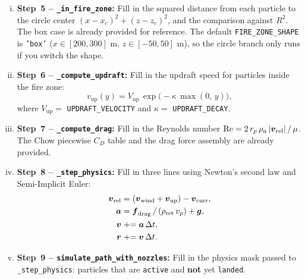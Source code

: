 \documentclass{article}
\begin{document}
\begin{enumerate}
\begin{enumerate}[(i)]
    \item \textbf{Step~5 -- \texttt{\_in\_fire\_zone}:}
          Fill in the squared distance from each particle to the circle center
          $(x - x_c)^2 + (z - z_c)^2$, and the comparison against $R^2$.
          The box case is already provided for reference. The default \texttt{FIRE\_ZONE\_SHAPE} is \texttt{'box'} ($x \in [200, 300]$ m, $z \in [-50, 50]$ m), so the circle branch only runs if you switch the shape.

    \item \textbf{Step~6 -- \texttt{\_compute\_updraft}:}
          Fill in the updraft speed for particles inside the fire zone:
          \begin{equation*}
              v_\text{up}(y) = V_\text{up}\,\exp\!\bigl(-\kappa\,\max(0,\,y)\bigr),
          \end{equation*}
          where $V_\text{up} = $ \texttt{UPDRAFT\_VELOCITY} and $\kappa = $ \texttt{UPDRAFT\_DECAY}.

    \item \textbf{Step~7 -- \texttt{\_compute\_drag}:}
          Fill in the Reynolds number
          $\mathrm{Re} = 2\,r_p\,\rho_a\,|\mbox{\boldmath $v$}_\text{rel}|\,/\,\mu$.
          The Chow piecewise $C_D$ table and the drag force assembly are already provided.

    \item \textbf{Step~8 -- \texttt{\_step\_physics}:}
          Fill in three lines using Newton's second law and Semi-Implicit Euler:
          \begin{align*}
              \mbox{\boldmath $v$}_\text{rel} &= (\mbox{\boldmath $v$}_\text{wind} + \mbox{\boldmath $v$}_\text{up}) - \mbox{\boldmath $v$}_\text{curr}, \\
              \mbox{\boldmath $a$}             &= \mbox{\boldmath $f$}_\text{drag}\,/\,(\rho_\text{ret}\,v_p) + \mbox{\boldmath $g$}, \\
              \mbox{\boldmath $v$}             &\mathrel{+}= \mbox{\boldmath $a$}\,\Delta t, \\ 
              \mbox{\boldmath $r$}              &\mathrel{+}= \mbox{\boldmath $v$}\,\Delta t.
          \end{align*}

    \item \textbf{Step~9 -- \texttt{simulate\_path\_with\_nozzles}:}
          Fill in the physics mask passed to \texttt{\_step\_physics}:
          particles that are \texttt{active} and \textbf{not} yet \texttt{landed}.


\end{enumerate}
\end{enumerate}
\end{document}
